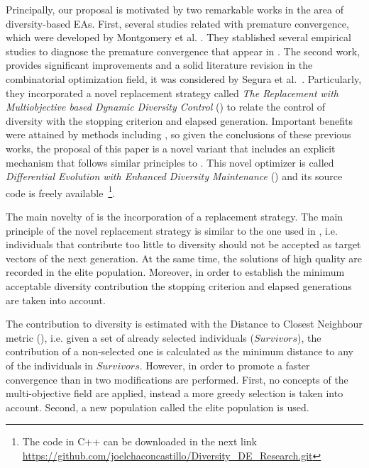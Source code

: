 Principally, our proposal is motivated by two remarkable works in the area of diversity-based EAs.
%
First, several studies related with premature convergence, which were developed by Montgomery et al. \cite{montgomery2012simple}.
%
They stablished several empirical studies to diagnose the premature convergence that appear in \DE{}.
%
The second work, provides significant improvements and a solid literature revision in the combinatorial optimization field, it was considered by Segura et al.~\cite{segura2016novel}.
%
Particularly, they incorporated a novel replacement strategy called \textit{The Replacement with Multiobjective based Dynamic Diversity Control} (\RMDDC{}) to relate the control of diversity with the stopping criterion and elapsed generation.
%
Important benefits were attained by methods including \RMDDC{}, so given the conclusions of these previous works, the proposal of this paper is a 
novel \DE{} variant that includes an explicit mechanism that follows similar principles to \RMDDC{}.
%
This novel optimizer is called \textit{Differential Evolution with Enhanced Diversity Maintenance} (\DEEDM{}) and its source
code is freely available~\footnote{The code in C++ can be downloaded in the next link \url{https://github.com/joelchaconcastillo/Diversity\_DE\_Research.git}}.

The main novelty of \DEEDM{} is the incorporation of a replacement strategy.
%
The main principle of the novel replacement strategy is similar to the one used in \RMDDC{}, i.e.
individuals that contribute too little to diversity should not be accepted as target vectors of the next generation.
%
At the same time, the solutions of high quality are recorded in the elite population.
%
Moreover, in order to establish the minimum acceptable diversity contribution the stopping criterion and elapsed
generations are taken into account.

The contribution to diversity is estimated with the Distance to Closest Neighbour metric (\DCN{}), i.e. given
a set of already selected individuals ($Survivors$), the contribution of a non-selected one is calculated as the minimum
distance to any of the individuals in $Survivors$.
%
However, in order to promote a faster convergence than in \RMDDC{} two modifications are performed.
%
First, no concepts of the multi-objective field are applied, instead a more greedy selection is taken into account.
%
Second, a new population called the elite population is used.

